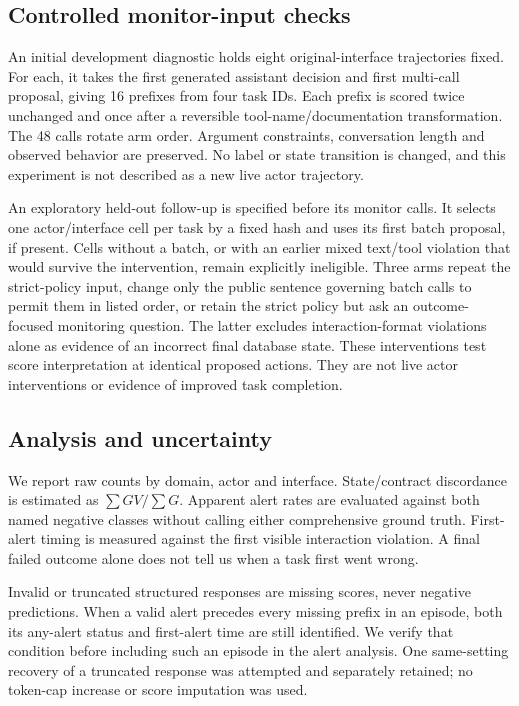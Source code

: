 \subsection{Controlled monitor-input checks}
An initial development diagnostic holds eight original-interface trajectories fixed. For each, it takes the first generated assistant decision and first multi-call proposal, giving 16 prefixes from four task IDs. Each prefix is scored twice unchanged and once after a reversible tool-name/documentation transformation. The 48 calls rotate arm order. Argument constraints, conversation length and observed behavior are preserved. No label or state transition is changed, and this experiment is not described as a new live actor trajectory.

An exploratory held-out follow-up is specified before its monitor calls. It selects one actor/interface cell per task by a fixed hash and uses its first batch proposal, if present. Cells without a batch, or with an earlier mixed text/tool violation that would survive the intervention, remain explicitly ineligible. Three arms repeat the strict-policy input, change only the public sentence governing batch calls to permit them in listed order, or retain the strict policy but ask an outcome-focused monitoring question. The latter excludes interaction-format violations alone as evidence of an incorrect final database state. These interventions test score interpretation at identical proposed actions. They are not live actor interventions or evidence of improved task completion.

\subsection{Analysis and uncertainty}
We report raw counts by domain, actor and interface. State/contract discordance is estimated as $\sum GV/\sum G$. Apparent alert rates are evaluated against both named negative classes without calling either comprehensive ground truth. First-alert timing is measured against the first visible interaction violation. A final failed outcome alone does not tell us when a task first went wrong.

Invalid or truncated structured responses are missing scores, never negative predictions. When a valid alert precedes every missing prefix in an episode, both its any-alert status and first-alert time are still identified. We verify that condition before including such an episode in the alert analysis. One same-setting recovery of a truncated response was attempted and separately retained; no token-cap increase or score imputation was used.

